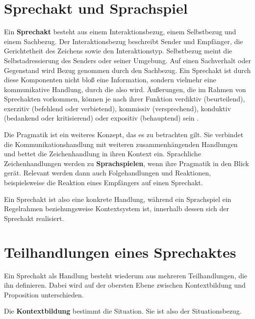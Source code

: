 \section{Sprechakt und Sprachspiel}
\label{sec:02-05_speech-act-and-language-game}

Ein \textbf{Sprechakt} besteht aus einem Interaktionsbezug, einem Selbstbezug und einem Sachbezug. Der Interaktionsbezug beschreibt Sender und Empfänger, die Gerichtetheit des Zeichens sowie den Interaktionstyp. Selbstbezug meint die Selbstadressierung des Senders oder seiner Umgebung. Auf einen Sachverhalt oder Gegenstand wird Bezug genommen durch den Sachbezug. \cite[S. 19 f.]{001_MKO02_media-as-means-of-communication} Ein Sprechakt ist durch diese Komponenten nicht bloß eine Information, sondern vielmehr eine kommunikative Handlung, durch die also  wird. Äußerungen, die im Rahmen von Sprechakten vorkommen, können je nach ihrer Funktion verdiktiv (beurteilend), exerzitiv (befehlend oder verbietend), kommissiv (versprechend), konduktiv (bedankend oder kritisierend) oder expositiv (behauptend) sein \cite[S. 23]{000_MKO01_communication-and-semiotics}.

Die Pragmatik ist ein weiteres Konzept, das es zu betrachten gilt. Sie verbindet die Kommunikationshandlung mit weiteren zusammenhängenden Handlungen und bettet die Zeichenhandlung in ihren Kontext ein. Sprachliche Zeichenhandlungen werden zu \textbf{Sprachspielen}, wenn ihre Pragmatik in den Blick gerät. Relevant werden dann auch Folgehandlungen und Reaktionen, beispielsweise die Reaktion eines Empfängers auf einen Sprechakt. \cite[S. 18]{001_MKO02_media-as-means-of-communication}

Ein Sprechakt ist also eine konkrete Handlung, während ein Sprachspiel ein Regelrahmen beziehungsweise Kontextsystem ist, innerhalb dessen sich der Sprechakt realisiert.

\section{Teilhandlungen eines Sprechaktes}
\label{sec:02-06_sub-actions-of-a-speech-act}

Ein Sprechakt als Handlung besteht wiederum aus mehreren Teilhandlungen, die ihn definieren. Dabei wird auf der obersten Ebene zwischen Kontextbildung und Proposition unterschieden.

Die \textbf{Kontextbildung} bestimmt die Situation. Sie ist also der Situationsbezug. \cite[S. 23]{001_MKO02_media-as-means-of-communication}

